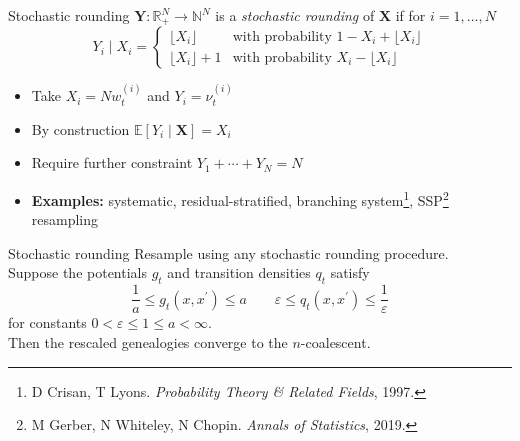 \documentclass[aspectratio=169]{beamer}
\theoremstyle{definition}
\newcommand{\E}{\mathbb{E}}
\newcommand{\vt}[2][t]{\nu_{#1}^{(#2)}}
\newcommand{\wt}[2][t]{w_{#1}^{(#2)}}
\begin{document}
\begin{frame}{Stochastic rounding}
$\mathbf{Y}: \mathbb{R}_+^N \to \mathbb{N}^N$ is a \emph{stochastic rounding} of $\mathbf{X}$ if for $i=1,\dots,N$
\begin{equation*}
Y_i \mid X_i =
\begin{cases}
 \lfloor X_i \rfloor & \text{with probability } 1- X_i + \lfloor X_i \rfloor \\
  \lfloor X_i \rfloor +1 & \text{with probability } X_i - \lfloor X_i \rfloor 
\end{cases}
\end{equation*}
\pause
\begin{itemize}
\item Take $X_i = N\wt{i}$ and $Y_i = \vt{i}$
\item By construction $\E[Y_i \mid \mathbf{X}] = X_i$
\item Require further constraint $Y_1 + \cdots + Y_N = N$
\pause
\item \textbf{Examples:} systematic, residual-stratified, branching system\footnote{D Crisan, T Lyons. \textit{Probability Theory \& Related Fields}, 1997.}, SSP\footnote{M Gerber, N Whiteley, N Chopin. \textit{Annals of Statistics}, 2019.} resampling
\end{itemize}
\end{frame}


\begin{frame}{Stochastic rounding}
Resample using any stochastic rounding procedure.\\[10pt]
\pause
Suppose the potentials $g_t$ and transition densities $q_t$ satisfy
\begin{equation*}
\frac{1}{a} \leq g_t(x, x^\prime) \leq a \qquad
\varepsilon \leq q_t(x, x^\prime) \leq \frac{1}{\varepsilon} 
\end{equation*}
for constants $0<\varepsilon\leq 1\leq a<\infty$.\\[10pt]
\pause
Then the rescaled genealogies converge to the $n$-coalescent.
\end{frame}
\end{document}
